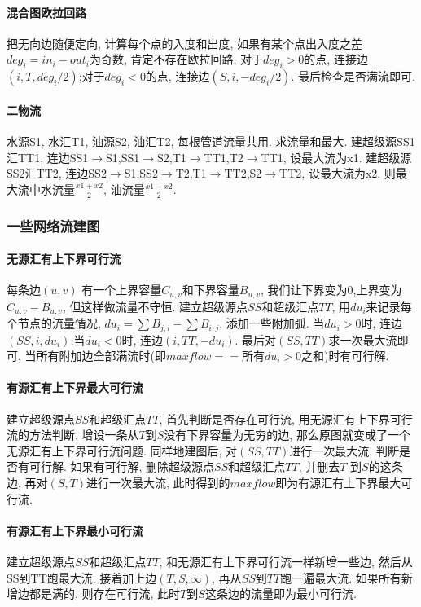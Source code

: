 \paragraph{混合图欧拉回路}把无向边随便定向, 计算每个点的入度和出度, 如果有某个点出入度之差$deg_i=in_i-out_i$为奇数, 肯定不存在欧拉回路. 对于$deg_i>0$的点, 连接边$(i,T,deg_i/2)$;对于$deg_i<0$的点, 连接边$(S,i,-deg_i/2)$. 最后检查是否满流即可. 
\paragraph{二物流}
水源S1, 水汇T1, 油源S2, 油汇T2, 每根管道流量共用. 求流量和最大.
建超级源SS1汇TT1, 连边SS1$\to$S1,SS1$\to$S2,T1$\to$TT1,T2$\to$TT1, 设最大流为x1.
建超级源SS2汇TT2, 连边SS2$\to$S1,SS2$\to$T2,T1$\to$TT2,S2$\to$TT2, 设最大流为x2.
则最大流中水流量$\frac{x1+x2}{2}$, 油流量$\frac{x1-x2}{2}$.

\subsubsection{一些网络流建图}
\paragraph{无源汇有上下界可行流}
每条边$(u,v)$ 有一个上界容量$C_{u,v}$和下界容量$B_{u,v}$, 我们让下界变为$0$,上界变为$C_{u,v}-B_{u,v}$, 但这样做流量不守恒. 建立超级源点$SS$和超级汇点$TT$, 用$du_i$来记录每个节点的流量情况, $du_i=\sum B_{j,i}-\sum B_{i,j}$, 添加一些附加弧. 当$du_i>0$时, 连边$(SS,i,du_i)$;当$du_i<0$时, 连边$(i,TT,-du_i)$. 最后对$(SS,TT)$求一次最大流即可, 当所有附加边全部满流时(即$maxflow==所有du_i>0之和$)时有可行解. 
\paragraph{有源汇有上下界最大可行流}
建立超级源点$SS$和超级汇点$TT$, 首先判断是否存在可行流, 用无源汇有上下界可行流的方法判断. 增设一条从$T$到$S$没有下界容量为无穷的边, 那么原图就变成了一个无源汇有上下界可行流问题. 同样地建图后, 对$(SS,TT)$进行一次最大流, 判断是否有可行解. 
如果有可行解, 删除超级源点$SS$和超级汇点$TT$, 并删去$T$ 到$S$的这条边, 再对$(S,T)$进行一次最大流, 此时得到的$maxflow$即为有源汇有上下界最大可行流. 
\paragraph{有源汇有上下界最小可行流}
建立超级源点$SS$和超级汇点$TT$, 和无源汇有上下界可行流一样新增一些边, 然后从SS到TT跑最大流. 接着加上边$(T,S,\infty)$, 再从$SS$到$TT$跑一遍最大流. 
如果所有新增边都是满的, 则存在可行流, 此时$T$到$S$这条边的流量即为最小可行流. 

